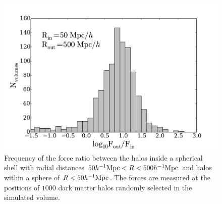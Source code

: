 \documentclass{article}
\newcommand{\hMpc}{{\ifmmode{h^{-1}{\rm Mpc}}\else{$h^{-1}$Mpc }\fi}}
\begin{document}
\begin{figure}
\begin{center}
\includegraphics[width=0.8\linewidth,angle=0]{spheres_nbody_200_1000.pdf}
\caption{\label{fig:sphere_nbody} Frequency of the force ratio between
  the halos inside a spherical shell with radial distances $50\hMpc <
  R < 500\hMpc$ and halos within a sphere of $R<50\hMpc$. The forces
  are measured at the positions of $1000$ dark matter halos randomly
  selected in the simulated volume.}
\end{center}
\end{figure}




 
\end{document}
